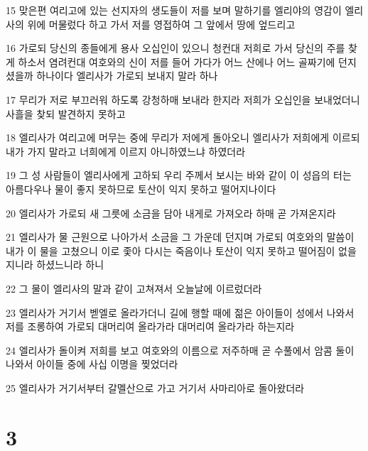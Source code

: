\par 15 맞은편 여리고에 있는 선지자의 생도들이 저를 보며 말하기를 엘리야의 영감이 엘리사의 위에 머물렀다 하고 가서 저를 영접하여 그 앞에서 땅에 엎드리고
\par 16 가로되 당신의 종들에게 용사 오십인이 있으니 청컨대 저희로 가서 당신의 주를 찾게 하소서 염려컨대 여호와의 신이 저를 들어 가다가 어느 산에나 어느 골짜기에 던지셨을까 하나이다 엘리사가 가로되 보내지 말라 하나
\par 17 무리가 저로 부끄러워 하도록 강청하매 보내라 한지라 저희가 오십인을 보내었더니 사흘을 찾되 발견하지 못하고
\par 18 엘리사가 여리고에 머무는 중에 무리가 저에게 돌아오니 엘리사가 저희에게 이르되 내가 가지 말라고 너희에게 이르지 아니하였느냐 하였더라
\par 19 그 성 사람들이 엘리사에게 고하되 우리 주께서 보시는 바와 같이 이 성읍의 터는 아름다우나 물이 좋지 못하므로 토산이 익지 못하고 떨어지나이다
\par 20 엘리사가 가로되 새 그릇에 소금을 담아 내게로 가져오라 하매 곧 가져온지라
\par 21 엘리사가 물 근원으로 나아가서 소금을 그 가운데 던지며 가로되 여호와의 말씀이 내가 이 물을 고쳤으니 이로 좇아 다시는 죽음이나 토산이 익지 못하고 떨어짐이 없을지니라 하셨느니라 하니
\par 22 그 물이 엘리사의 말과 같이 고쳐져서 오늘날에 이르렀더라
\par 23 엘리사가 거기서 벧엘로 올라가더니 길에 행할 때에 젊은 아이들이 성에서 나와서 저를 조롱하여 가로되 대머리여 올라가라 대머리여 올라가라 하는지라
\par 24 엘리사가 돌이켜 저희를 보고 여호와의 이름으로 저주하매 곧 수풀에서 암콤 둘이 나와서 아이들 중에 사십 이명을 찢었더라
\par 25 엘리사가 거기서부터 갈멜산으로 가고 거기서 사마리아로 돌아왔더라

\chapter{3}

